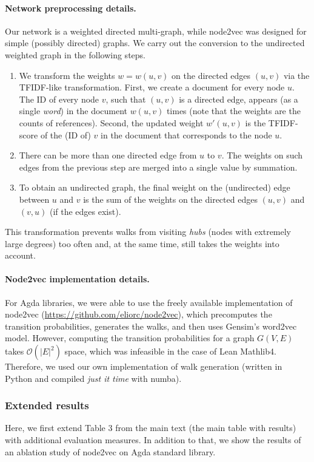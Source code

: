 \documentclass{article}
\begin{document}
\paragraph{Network preprocessing details.} Our network is a weighted directed multi-graph,
while node2vec was designed for simple (possibly directed) graphs. We carry out the conversion to the undirected weighted graph in the following steps.
\begin{enumerate}
    \item We transform the weights $w = w(u, v)$ on the directed edges $(u, v)$ via the TFIDF-like transformation.
          First, we create a document for every node $u$. The ID of every node $v$, such that $(u, v)$
          is a directed edge, appears (as a single \textit{word}) in the document $w(u, v)$ times (note that the weights are the counts of references).
          Second, the updated weight $w'(u, v)$ is the TFIDF-score of the (ID of) $v$ in the document that corresponds to the node $u$.
    \item There can be more than one directed edge from $u$ to $v$. The weights on such edges from the previous step are merged into a single value by summation.
    \item To obtain an undirected graph, the final weight on the (undirected) edge between $u$ and $v$ is the sum of the weights on the directed edges
    $(u, v)$ and $(v, u)$ (if the edges exist).
\end{enumerate}
This transformation prevents walks from visiting \emph{hubs} (nodes with extremely large degrees) too often
and, at the same time, still takes the weights into account.

\paragraph{Node2vec implementation details.}
For Agda libraries, we were able to use the freely available implementation of node2vec (\url{https://github.com/eliorc/node2vec}),
which precomputes the transition probabilities, generates the walks, and then uses Gensim's word2vec model.
However, computing the transition probabilities for a graph $G(V, E)$ takes $\mathcal{O}(|E|^2)$ space,
which was infeasible in the case of Lean Mathlib4. Therefore, we used our own implementation of walk generation
(written in Python and compiled \emph{just it time} with numba).

\subsubsection{Extended results}
Here, we first extend Table 3 from the main text (the main table with results) with additional evaluation measures.
In addition to that, we show the results of an ablation study of node2vec on Agda standard library.
\end{document}
